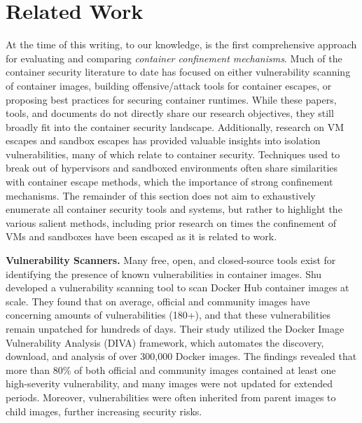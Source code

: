 \section{Related Work}%
\label{sec:related}

At the time of this writing, to our knowledge, \houdini is the first comprehensive approach for evaluating and comparing \textit{container confinement mechanisms}. Much of the container security literature to date has focused on either vulnerability scanning of container images, building offensive/attack tools for container escapes, or proposing best practices for securing container runtimes. While these papers, tools, and documents do not directly share our research objectives, they still broadly fit into the container security landscape. Additionally, research on VM escapes and sandbox escapes has provided valuable insights into isolation vulnerabilities, many of which relate to container security. Techniques used to break out of hypervisors and sandboxed environments often share similarities with container escape methods, which the importance of strong confinement mechanisms. The remainder of this section does not aim to exhaustively enumerate all container security tools and systems, but rather to highlight the various salient methods, including prior research on times the confinement of VMs and sandboxes have been escaped as it is  related to work.

\noindent\textbf{Vulnerability Scanners.} Many free, open, and closed-source tools exist for identifying the presence of known vulnerabilities in container images. Shu \etal~\cite{shu2017study} developed a vulnerability scanning tool to scan Docker Hub container images at scale. They found that on average, official and community images have concerning amounts of vulnerabilities (180+), and that these vulnerabilities remain unpatched for hundreds of days. Their study utilized the Docker Image Vulnerability Analysis (DIVA) framework, which automates the discovery, download, and analysis of over 300,000 Docker images. The findings revealed that more than 80\% of both official and community images contained at least one high-severity vulnerability, and many images were not updated for extended periods. Moreover, vulnerabilities were often inherited from parent images to child images, further increasing security risks.

